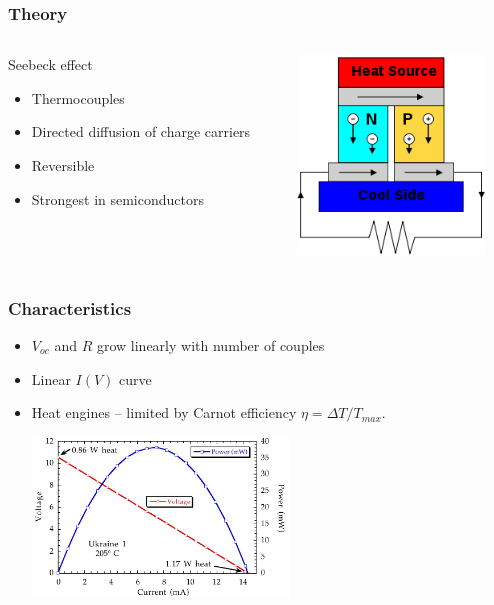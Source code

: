 \documentclass{beamer}
\begin{document}
\begin{frame}
\begin{columns}
\end{columns}

\end{frame}


\begin{frame}
  \frametitle{Theory}
\begin{columns}
  
\begin{column}{.5\textwidth}
\begin{block}{Seebeck effect}
  \begin{itemize}
    \item Thermocouples
    \item Directed diffusion of charge carriers
    \item Reversible
    \item Strongest in semiconductors
  \end{itemize}
\end{block}
\end{column}

\begin{column}{.5\textwidth}
\begin{block}{}
\includegraphics[height=150pt]{./Slike/TEG-couple}
\end{block}
\end{column}
\end{columns}
\end{frame}

\begin{frame}
  \frametitle{Characteristics}
\begin{itemize}
  \item $V_{oc}$ and $R$ grow linearly with number of couples
  \item Linear $I(V)$ curve
  \item Heat engines -- limited by Carnot efficiency $\eta = \Delta T / T_{max}$. 

\begin{center}
  \includegraphics[height=120pt]{./Slike/TEG-curve}
\end{center}
 
\end{itemize}

\end{frame}
\end{document}
